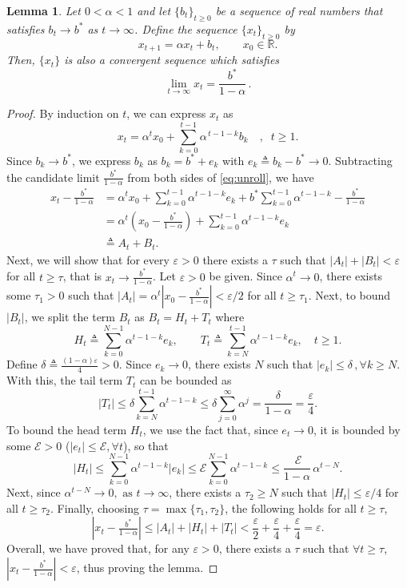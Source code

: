\documentclass[conference]{IEEEtran}
\newcommand{\nm}[1]{\textcolor{magenta}{\bf [NM: #1]}}
\newtheorem{lemma}[theorem]{Lemma}
\begin{document}
\begin{lemma}
\label{lemma:convergent_seq}
Let $0<\alpha<1$ and let $\{b_t\}_{t\ge0}$ be a sequence of real numbers that satisfies $b_t\to b^*$ as $t \to \infty$.
Define the sequence $\{x_t\}_{t\ge0}$ by
$$
x_{t+1}=\alpha x_t+ b_t,\qquad x_0\in\mathbb{R}.
$$
Then, $\{x_t\}$ is also a convergent sequence which satisfies 
\[
\lim_{t\to\infty}x_t =\frac{b^*}{1-\alpha}\,.
\]
\end{lemma}

\begin{proof}
By induction on $t$, we can express $x_t$ as 
\begin{equation}\label{eq:unroll}
x_t=\alpha^t x_0+\sum_{k=0}^{t-1}\alpha^{\,t-1-k}b_k
\quad ,\;\;t\geq 1.
\end{equation}
Since $b_k \to b^*$, we express $b_k$ as $b_k=b^*+e_k$ with $e_k \triangleq b_k-b^*\to0$. Subtracting the candidate limit $\frac{b^*}{1-\alpha}$ from both sides of \eqref{eq:unroll}, we have
\[
\begin{aligned}
x_t-\frac{b^*}{1-\alpha}
&=\alpha^t x_0
+\sum_{k=0}^{t-1}\alpha^{t-1-k}e_k
+ b^* \sum_{k=0}^{t-1}\alpha^{t-1-k} -\frac{b^*}{1-\alpha}\\
 &= \alpha^t(x_0 - \frac{b^*}{1-\alpha}) +\sum_{k=0}^{t-1}\alpha^{t-1-k}e_k  \\
&\triangleq A_t+B_t.
\end{aligned}
\]
Next, we will show that for every $\varepsilon>0$ there exists a $\tau$ such that
$|A_t|+|B_t|<\varepsilon$ for all $t \geq \tau$, that is $x_t \to \frac{b^*}{1-\alpha}$.
Let  $\varepsilon >0$ be given. Since $\alpha^t\to0$, there exists some $\tau_1 > 0$ such that
$|A_t|=\alpha^t|x_0 - \frac{b^*}{1-\alpha}|<\varepsilon/2$ for all $t\geq \tau_1$. Next, to bound $|B_t|$, we split the term $B_t$ as $B_t=H_t+T_t$ where
$$
H_t\triangleq \sum_{k=0}^{N-1}\alpha^{t-1-k}e_k,
\qquad
T_t \triangleq\sum_{k=N}^{t-1}\alpha^{t-1-k}e_k, \quad t \geq 1.
$$
Define $\delta \triangleq \frac{(1-\alpha)\varepsilon}{4} >0$. Since $e_k\to0$, there
exists  $N$ such that
$|e_k|\leq\delta\,, \forall k\geq N.$ With this, the tail term $T_t$ can be bounded as 
$$
|T_t|
\leq \delta\sum_{k=N}^{t-1}\alpha^{t-1-k} 
\leq \delta\sum_{j=0}^{\infty}\alpha^j
=\frac{\delta}{1-\alpha}
=\frac{\varepsilon}{4}.
$$
To bound the head term $H_t$, we use the fact that, since $e_t\to 0$, it is bounded by some $\mathcal{E} >0$ ($|e_t|\leq \mathcal{E},\forall t$), so that 
$$
|H_t|
\leq \sum_{k=0}^{N-1}\alpha^{t-1-k} |e_k| \leq  \mathcal{E} \sum_{k=0}^{N-1}\alpha^{t-1-k}
\leq \frac{\ \mathcal{E}}{1-\alpha}\,\alpha^{t-N}.
$$
Next, since $ \alpha^{t-N} \to 0, \text{ as } t \to \infty$, there exists a $\tau_2\geq N$ such that $|H_t|\leq \varepsilon/4$ for all $t\geq \tau_2$. Finally, choosing $\tau = \max\{\tau_1,\tau_2\}$, the following holds for all $t\geq \tau$,
$$
|x_t-\tfrac{b^*}{1-\alpha}|  
\leq |A_t|+|H_t|+|T_t|
< \frac{\varepsilon}{2}+\frac{\varepsilon}{4}+\frac{\varepsilon}{4}
=\varepsilon.
$$
Overall, we have proved that, for any $\varepsilon>0$, there exists a $\tau$ such that $\forall t\geq \tau$, $|x_t-\tfrac{b^*}{1-\alpha}|<\varepsilon$, thus proving the lemma.
\end{proof}



\balance
\end{document}

